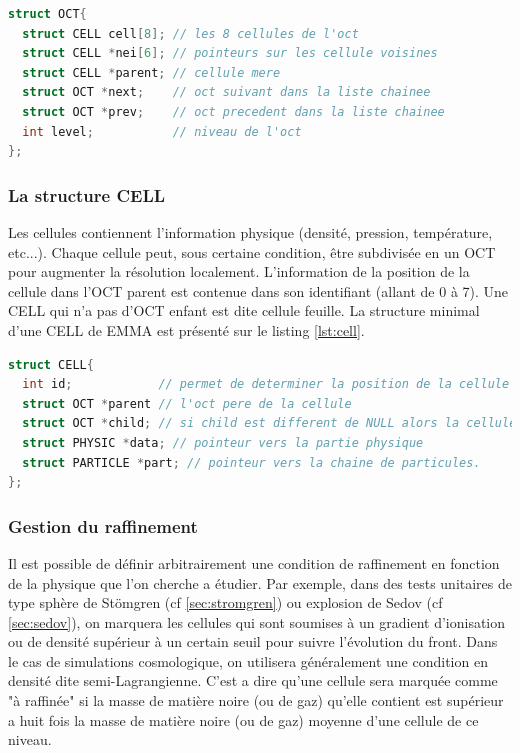 \begin{lstlisting}[float=bth,language=C,frame=tb,caption={La structure OCT de EMMA},label=lst:oct]
struct OCT{
  struct CELL cell[8]; // les 8 cellules de l'oct
  struct CELL *nei[6]; // pointeurs sur les cellule voisines
  struct CELL *parent; // cellule mere
  struct OCT *next;    // oct suivant dans la liste chainee
  struct OCT *prev;    // oct precedent dans la liste chainee
  int level;           // niveau de l'oct
};
\end{lstlisting}

\subsubsection{La structure CELL}

Les cellules contiennent l'information physique (densité, pression, température, etc...).
Chaque cellule peut, sous certaine condition, être subdivisée en un OCT pour augmenter la résolution localement.
L'information de la position de la cellule dans l'OCT parent est contenue dans son identifiant (allant de 0 à 7).
Une CELL qui n'a pas d'OCT enfant est dite cellule feuille.
La structure minimal d'une CELL de EMMA est présenté sur le listing \ref{lst:cell}.

\begin{lstlisting}[float=bth,language=C,frame=tb,caption={La structure CELL de EMMA},label=lst:cell]
struct CELL{
  int id;            // permet de determiner la position de la cellule dans l'oct
  struct OCT *parent // l'oct pere de la cellule
  struct OCT *child; // si child est different de NULL alors la cellule est raffinee et child point vers l'oct enfant
  struct PHYSIC *data; // pointeur vers la partie physique
  struct PARTICLE *part; // pointeur vers la chaine de particules.
};
\end{lstlisting}

\subsubsection{Gestion du raffinement}
\label{sec:raffinement}

Il est possible de définir arbitrairement une condition de raffinement en fonction de la physique que l'on cherche a étudier.
Par exemple, dans des tests unitaires de type sphère de Stömgren (cf \ref{sec:stromgren}) ou explosion de Sedov (cf \ref{sec:sedov}), on marquera les cellules qui sont soumises à un gradient d'ionisation ou de densité supérieur à un certain seuil pour suivre l'évolution du front.
Dans le cas de simulations cosmologique, on utilisera généralement une condition en densité dite semi-Lagrangienne.
C'est a dire qu'une cellule sera marquée comme "à raffinée" si la masse de matière noire (ou de gaz) qu'elle contient est supérieur a huit fois la masse de matière noire (ou de gaz) moyenne d'une cellule de ce niveau.

